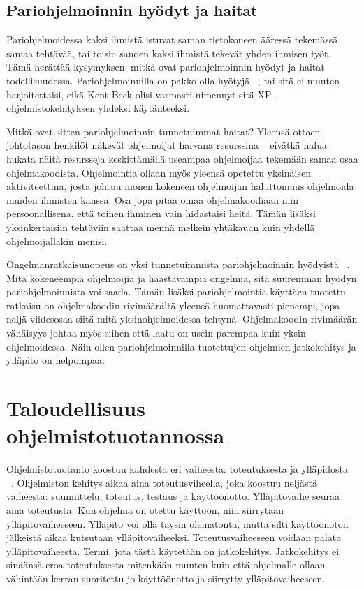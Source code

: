 \documentclass[finnish]{tktltiki2}
\theoremstyle{definition}
\theoremstyle{remark}
\begin{document}
\subsection{Pariohjelmoinnin hyödyt ja haitat}

Pariohjelmoidessa kaksi ihmistä istuvat saman tietokoneen ääressä tekemässä samaa tehtävää, tai toisin sanoen kaksi ihmistä tekevät yhden ihmisen työt. Tämä herättää kysymyksen, mitkä ovat pariohjelmoinnin hyödyt ja haitat todellisuudessa. Pariohjelmoinnilla on pakko olla hyötyjä  ~\cite{costandbenefit}, tai sitä ei muuten harjoitettaisi, eikä Kent Beck olisi varmasti nimennyt sitä XP-ohjelmistokehityksen yhdeksi käytänteeksi.

Mitkä ovat sitten pariohjelmoinnin tunnetuimmat haitat? Yleensä ottaen johtotason henkilöt näkevät ohjelmoijat harvana resurssina ~\cite{costandbenefit2} eivätkä halua hukata näitä resursseja keskittämällä useampaa ohjelmoijaa tekemään samaa osaa ohjelmakoodista. Ohjelmointia ollaan myös yleensä opetettu yksinäisen aktiviteettina, josta johtuu monen kokeneen ohjelmoijan haluttomuus ohjelmoida muiden ihmisten kanssa. Osa jopa pitää omaa ohjelmakoodiaan niin persoonallisena, että toinen ihminen vain hidastaisi heitä. Tämän lisäksi yksinkertaisiin tehtäviin saattaa mennä melkein yhtäkauan kuin yhdellä ohjelmoijallakin menisi.

Ongelmanratkaisunopeus on yksi tunnetuimmista pariohjelmoinnin hyödyistä ~\cite{costandbenefit2}. Mitä kokeneempia ohjelmoijia ja haastavampia ongelmia, sitä suuremman hyödyn pariohjelmoinnista voi saada. Tämän lisäksi pariohjelmointia käyttäen tuotettu ratkaisu on ohjelmakoodin rivimäärältä yleensä huomattavasti pienempi, jopa neljä viidesosaa siitä mitä yksinohjelmoidessa tehtynä. Ohjelmakoodin rivimäärän vähäisyys johtaa myös siihen että laatu on usein parempaa kuin yksin ohjelmoidessa. Näin ollen pariohjelmoinnilla tuotettujen ohjelmien jatkokehitys ja ylläpito on helpompaa.


\section{Taloudellisuus ohjelmistotuotannossa}

Ohjelmistotuotanto koostuu kahdesta eri vaiheesta: toteutuksesta ja ylläpidosta ~\cite{sommerville1998requirements}. Ohjelmiston kehitys alkaa aina toteutusviheella, joka koostuu neljästä vaiheesta: suunnittelu, toteutus, testaus ja käyttöönotto. Ylläpitovaihe seuraa aina toteutusta. Kun ohjelma on otettu käyttöön, niin siirrytään ylläpitovaiheeseen. Ylläpito voi olla täysin olematonta, mutta silti käyttöönoton jälkeistä aikaa kutsutaan ylläpitovaiheeksi. Toteutusvaiheeseen voidaan palata ylläpitovaiheesta. Termi, jota tästä käytetään on jatkokehitys. Jatkokehitys ei sinäänsä eroa toteutuksesta mitenkään muuten kuin että ohjelmalle ollaan vähintään kerran suoritettu jo käyttöönotto ja siirrytty ylläpitovaiheeseen.
\end{document}
